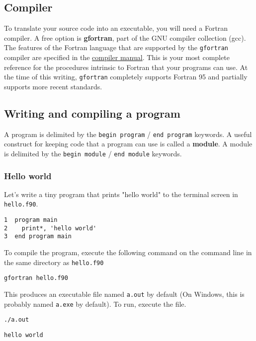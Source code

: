 \documentclass[11pt]{article}
\begin{document}
\subsection{Compiler}
\label{sec:orgheadline4}
To translate your source code into an executable, you will need a Fortran compiler. A free option is \textbf{gfortran}, part of the GNU compiler collection (gcc). The features of the Fortran language that are supported by the \texttt{gfortran} compiler are specified in the \href{https://gcc.gnu.org/onlinedocs/gfortran/}{compiler manual}. This is your most complete reference for the procedures intrinsic to Fortran that your programs can use. At the time of this writing, \texttt{gfortran} completely supports Fortran 95 and partially supports more recent standards.
\subsection{Writing and compiling a program}
\label{sec:orgheadline7}
A program is delimited by the \texttt{begin program} / \texttt{end program} keywords. A useful construct for keeping code that a program can use is called a \textbf{module}. A module is delimited by the \texttt{begin module} / \texttt{end module} keywords.
\subsubsection{Hello world}
\label{sec:orgheadline5}
Let's write a tiny program that prints "hello world" to the terminal screen in \texttt{hello.f90}.

\begin{verbatim}
1  program main
2    print*, 'hello world'
3  end program main
\end{verbatim}

To compile the program, execute the following command on the command line in the same directory as \texttt{hello.f90}

\begin{verbatim}
gfortran hello.f90
\end{verbatim}

This produces an executable file named \texttt{a.out} by default (On Windows, this is probably named \texttt{a.exe} by default). To run, execute the file.

\begin{verbatim}
./a.out
\end{verbatim}

\begin{verbatim}
hello world
\end{verbatim}
\end{document}
